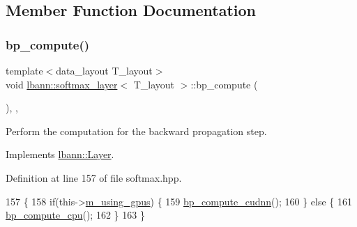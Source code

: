 \subsection{Member Function Documentation}
\mbox{\label{classlbann_1_1softmax__layer_a82e9fd693e34c6e8ebc77802940ad079}} 
\subsubsection{\texorpdfstring{bp\+\_\+compute()}{bp\_compute()}}
{\footnotesize\ttfamily template$<$data\+\_\+layout T\+\_\+layout$>$ \\
void \hyperlink{classlbann_1_1softmax__layer}{lbann\+::softmax\+\_\+layer}$<$ T\+\_\+layout $>$\+::bp\+\_\+compute (\begin{DoxyParamCaption}{ }\end{DoxyParamCaption})\hspace{0.3cm}{\ttfamily [inline]}, {\ttfamily [override]}, {\ttfamily [virtual]}}

Perform the computation for the backward propagation step. 

Implements \hyperlink{classlbann_1_1Layer_a7442e01f9ee1294df2de811efcf5171e}{lbann\+::\+Layer}.



Definition at line 157 of file softmax.\+hpp.


\begin{DoxyCode}
157                              \{
158     \textcolor{keywordflow}{if}(this->\hyperlink{classlbann_1_1Layer_af7881cb5eff5207c15fa835d65462e8f}{m\_using\_gpus}) \{
159       \hyperlink{classlbann_1_1softmax__layer_a507c8c53b4a1bc20b6e5b70ce05d7f67}{bp\_compute\_cudnn}();
160     \} \textcolor{keywordflow}{else} \{
161       \hyperlink{classlbann_1_1softmax__layer_ac9ba1f8425f6d59ed7f12b8b7fb5b7c0}{bp\_compute\_cpu}();
162     \}
163   \}
\end{DoxyCode}
\mbox{\label{classlbann_1_1softmax__layer_ac9ba1f8425f6d59ed7f12b8b7fb5b7c0}} 
